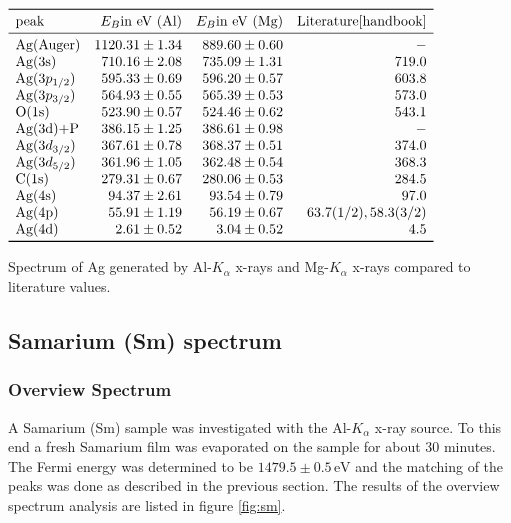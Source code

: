 \documentclass[a4paper]{scrartcl}
\numberwithin{equation}{section}
\numberwithin{figure}{section}
\numberwithin{table}{section}
\begin{document}
\begin{table}
\centering
$
\begin{array}{lrrr}
\toprule
\text{peak} & E_B \text{in eV (Al)}  &  E_B \text{in eV (Mg)} & \text{Literature} \cite{handbook} \\
\midrule
\text{Ag(Auger)} &  1120.31 \pm 1.34 &  889.60 \pm 0.60 &-\\
\text{Ag(3s)} &  710.16 \pm 2.08 &  735.09 \pm 1.31 &719.0\\
\text{Ag}(3p_{1/2}) & 595.33 \pm 0.69 &   596.20 \pm 0.57 &603.8 \\
\text{Ag}(3p_{3/2}) & 564.93 \pm 0.55 &   565.39 \pm 0.53  & 573.0\\
\text{O(1s)} & 523.90 \pm 0.57 &  524.46 \pm 0.62 &  543.1 \\
 \text{Ag(3d)+P} & 386.15 \pm 1.25 & 386.61 \pm 0.98  &-\\
\text{Ag}(3d_{3/2}) & 367.61 \pm 0.78 &  368.37 \pm 0.51 & 374.0 \\
\text{Ag} (3d_{5/2}) &  361.96 \pm 1.05 & 362.48 \pm 0.54 & 368.3 \\
 \text{C(1s)} & 279.31 \pm 0.67 &  280.06 \pm 0.53 & 284.5 \\
\text{Ag(4s)} & 94.37 \pm 2.61 &  93.54 \pm 0.79 & 97.0 \\
\text{Ag(4p)} & 55.91 \pm 1.19 & 56.19 \pm 0.67  & 63.7 (1/2), 58.3 (3/2) \\
 \text{Ag(4d)} & 2.61 \pm 0.52 &  3.04 \pm 0.52 & 4.5 \\
 \bottomrule
\end{array}
$
\caption{
\small Spectrum of Ag generated by Al-$K_\alpha$ x-rays and Mg-$K_\alpha$ x-rays compared to literature values.   } 
	\label{fig:tabelle}
\end{table}



\subsection{Samarium (Sm) spectrum}
\subsubsection{Overview Spectrum}
A Samarium (Sm) sample was investigated with the Al-$K_\alpha$ x-ray source. To this end a fresh Samarium film was evaporated on the sample for about 30 minutes. The Fermi energy was determined to be $1479.5\pm 0.5 \,\text{eV}$ and the matching of the peaks was done as described in the previous section. The results of the overview spectrum analysis are listed in figure \ref{fig:sm}.
\end{document}
